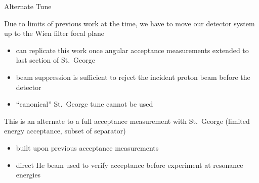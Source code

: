 \documentclass[10pt]{beamer}
\begin{document}
\begin{frame}[fragile]{Alternate Tune}

    Due to limits of previous work at the time, we have to move our detector system up to the Wien filter focal plane
    \begin{itemize}
        \item can replicate this work once angular acceptance measurements extended to last section of St.\ George
        \item beam suppression is sufficient to reject the incident proton beam before the detector
        \item ``canonical'' St.\ George tune cannot be used
    \end{itemize}

    This is an alternate to a full acceptance measurement with St.\ George (limited energy acceptance, subset of separator)
    \begin{itemize}
        \item built upon previous acceptance measurements
        \item direct He beam used to verify acceptance before experiment at resonance energies
    \end{itemize}

\end{frame}
\end{document}
